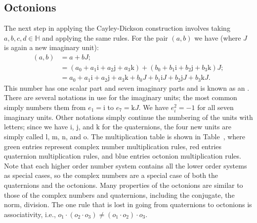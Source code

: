 \subsection{Octonions}
The next step in applying the Cayley-Dickson construction involves taking $a,b,c,d\in\mathbb{H}$ and applying the same rules.  For the pair $(a,b)$ we have (where $J$ is again a new imaginary unit):
\begin{equation}
\begin{split}
	(a,b) &= a+bJ;\\
	&= (a_0+a_1\mathrm{i}+a_2\mathrm{j}+a_3\mathrm{k})+ (b_0+b_1\mathrm{i}+b_2\mathrm{j}+b_3\mathrm{k})J;\\
	&= a_0+a_1\mathrm{i}+a_2\mathrm{j}+a_3\mathrm{k} + b_0J+b_1\mathrm{i}J+b_2\mathrm{j}J+b_3\mathrm{k}J.
\end{split}
\end{equation}
This number has one scalar part and seven imaginary parts and is known as an .  There are several notations in use for the imaginary units; the most common simply numbers them from $e_1=\mathrm{i}$ to $e_7=\mathrm{k}J$.  We have $e_i^2=-1$ for all seven imaginary units. Other notations simply continue the numbering of the units with letters; since we have $\mathrm{i}$, $\mathrm{j}$, and $\mathrm{k}$ for the quaternions, the four new units are simply called  $\mathrm{l}$, $\mathrm{m}$, $\mathrm{n}$, and $\mathrm{o}$. The multiplication table is shown in Table~, where {\color{OCGreenThread}green entries} represent complex number multiplication rules, {\color{OCCarnegieRed}red entries} quaternion multiplication rules, and {\color{OCHighlandsSkyBlue}blue entries} octonion multiplication rules. Note that each higher order number system contains all the lower order systems as special cases, so the complex numbers are a special case of both the quaternions and the octonions.  Many properties of the octonions are similar to those of the complex numbers and quaternions, including the conjugate, the norm, division.  The one rule that is lost in going from quaternions to octonions is associativity, i.e., $o_1\cdot(o_2\cdot o_3)\ne (o_1\cdot o_2)\cdot o_3$.

